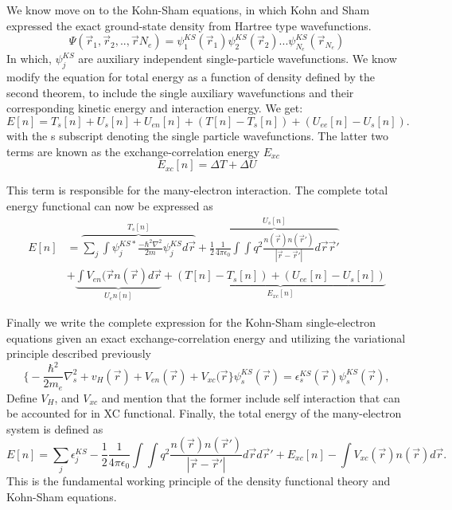 We know move on to the Kohn-Sham equations, in which Kohn and Sham expressed the exact ground-state density from Hartree type wavefunctions. 
\begin{equation}
    \Psi(\vec{r}_1, \vec{r}_2 , .., \vec{r}{N_e}) = \psi_1^{KS}(\vec{r}_1)\psi_2^{KS}(\vec{r}_2)...\psi_{N_e}^{KS}(\vec{r}_{N_e})
\end{equation}
In which, $\psi_j^{KS}$ are auxiliary independent single-particle wavefunctions. We know modify the equation for total energy as a function of density defined by the second theorem, to include the single auxiliary wavefunctions and their corresponding kinetic energy and interaction energy. We get:
\begin{equation}
    E[n] = T_s[n] + U_s[n] + U_{en}[n] + (T[n] - T_s[n]) + (U_{ee}[n] - U_s[n]).
\end{equation}
with the s subscript denoting the single particle wavefunctions. The latter two terms are known as the exchange-correlation energy $E_{xc}$
\begin{equation}
    E_{xc}[n] = \Delta T + \Delta U
\end{equation}

This term is responsible for the many-electron interaction. The complete total energy functional can now be expressed as
\begin{equation}
    \begin{split}
    E[n] &= \overbrace{\sum_j \int \psi_j^{KS*}\frac{-\hbar^2 \nabla^2}{2m}\psi_j^{KS}d\vec{r}}^{T_s[n]} + \overbrace{\frac{1}{2}\frac{1}{4\pi \epsilon_0} \int \int q^2 \frac{n(\vec{r})n(\vec{r}')}{|\vec{r} - \vec{r}'|}d\vec{r}\vec{r}'}^{U_s[n]} \\ 
        &+ \underbrace{\int V_{en}(\vec{r}n(\vec{r})d\vec{r}}_{U_en[n]} + \underbrace{(T[n] - T_s[n]) + (U_{ee}[n] - U_s[n])}_{E_{xc}[n]}
    \end{split}
\end{equation}

Finally we write the complete expression for the Kohn-Sham single-electron equations given an exact exchange-correlation energy and utilizing the variational principle described previously
\begin{equation}
    \bigg\{ -\frac{\hbar^2}{2m_e}\nabla^2_s + v_H(\vec{r}) + V_{en}(\vec{r}) + V_{xc}(\vec{r} \bigg\}\psi_s^{KS}(\vec{r}) = \epsilon_s^{KS}(\vec{r})\psi_s^{KS}(\vec{r}),
\end{equation}
Define $V_H$, and $V_{xc}$ and mention that the former include self interaction that can be accounted for in XC functional. Finally, the total energy of the many-electron system is defined as
\begin{equation}
    E[n] = \sum_j \epsilon_j^{KS} - \frac{1}{2}\frac{1}{4\pi\epsilon_0} \int \int q^2 \frac{n(\vec{r})n(\vec{r}')}{|\vec{r} - \vec{r}'|}d\vec{r}d\vec{r}' + E_{xc}[n] - \int V_{xc}(\vec{r})n(\vec{r})d\vec{r}.
\end{equation}
This is the fundamental working principle of the density functional theory and Kohn-Sham equations.

